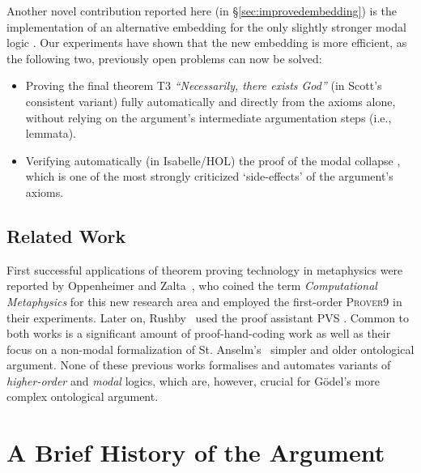 \documentclass{article}
\begin{document}
Another novel contribution reported here (in \S\ref{sec:improvedembedding}) is
the implementation of an alternative embedding for the only slightly
stronger modal logic \SFiveU. Our experiments have shown that the new
embedding is more efficient, as the following two, previously open problems can now be solved:
\begin{itemize}
\item Proving the final theorem T3 \textit{``Necessarily, there
    exists God''} (in Scott's  consistent variant) fully automatically and directly from the axioms
  alone, without relying on the argument's intermediate argumentation
  steps (i.e., lemmata).
\item Verifying automatically (in Isabelle/HOL) the proof of the modal
  collapse \cite{Sobel}, which is one of the most strongly criticized
  `side-effects' of the argument's axioms.
\end{itemize}


\subsection{Related Work}

First successful applications of theorem proving technology in
metaphysics were reported by Oppenheimer and
Zalta~, who coined the term \textit{Computational Metaphysics} for this new research area and employed the first-order
\textsc{Prover9} \cite{prover9-mace4} in their experiments. Later on, Rushby~ used the proof assistant \textsc{PVS} \cite{cade92-pvs}. Common to both
works is a significant amount of proof-hand-coding work as well as their
focus on a non-modal formalization of St. Anselm's~ simpler 
and older ontological argument. 
None of these previous works formalises and automates variants of \emph{higher-order} and \emph{modal} logics, which are, however, crucial
for G\"{o}del's more complex ontological argument.


\section{A Brief History of the Argument}\label{sec:history}
\end{document}
